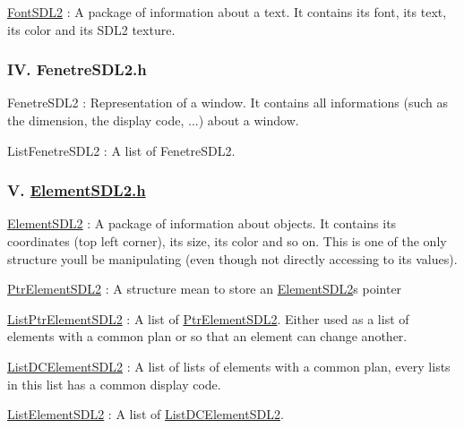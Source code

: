 \begin{DoxyEnumerate}
\item \hyperlink{structFontSDL2}{Font\+S\+D\+L2} \+: A package of information about a text. It contains its font, its text, its color and its S\+D\+L2 texture.
\end{DoxyEnumerate}

\subsubsection*{IV. Fenetre\+S\+D\+L2.\+h}


\begin{DoxyEnumerate}
\item Fenetre\+S\+D\+L2 \+: Representation of a window. It contains all informations (such as the dimension, the display code, ...) about a window.
\item List\+Fenetre\+S\+D\+L2 \+: A list of Fenetre\+S\+D\+L2.
\end{DoxyEnumerate}

\subsubsection*{V. \hyperlink{ElementSDL2_8h}{Element\+S\+D\+L2.\+h}}


\begin{DoxyEnumerate}
\item \hyperlink{structElementSDL2}{Element\+S\+D\+L2} \+: A package of information about objects. It contains its coordinates (top left corner), its size, its color and so on. This is one of the only structure you\textquotesingle{}ll be manipulating (even though not directly accessing to its values).
\item \hyperlink{structPtrElementSDL2}{Ptr\+Element\+S\+D\+L2} \+: A structure mean to store an \hyperlink{structElementSDL2}{Element\+S\+D\+L2}\textquotesingle{}s pointer
\item \hyperlink{structListPtrElementSDL2}{List\+Ptr\+Element\+S\+D\+L2} \+: A list of \hyperlink{structPtrElementSDL2}{Ptr\+Element\+S\+D\+L2}. Either used as a list of elements with a common plan or so that an element can change another.
\item \hyperlink{structListDCElementSDL2}{List\+D\+C\+Element\+S\+D\+L2} \+: A list of lists of elements with a common plan, every lists in this list has a common display code.
\item \hyperlink{structListElementSDL2}{List\+Element\+S\+D\+L2} \+: A list of \hyperlink{structListDCElementSDL2}{List\+D\+C\+Element\+S\+D\+L2}.
\end{DoxyEnumerate}


